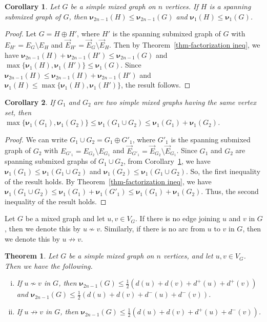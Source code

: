 \documentclass[12pt]{article}
\numberwithin{equation}{section}
\newtheorem{thm}{Theorem}[section]
\newtheorem{cor}{Corollary}[section]
\begin{document}
	\begin{cor}\label{cor-spanning ineq}
		Let $G$ be a simple mixed graph on $n$ vertices. If $H$ is a spanning submixed graph of $G$, then $\bm{\nu}_{2n-1}(H)\leq\bm{\nu}_{2n-1}(G)$ and $\bm{\nu}_{1}(H)\leq\bm{\nu}_{1}(G)$.
	\end{cor}
	\begin{proof}
		Let $G=H\oplus H'$, where $H'$ is the spanning submixed graph of $G$ with $E_{H'}=E_G\setminus E_H$ and $\vec{E}_{H'}=\vec{E}_G\setminus\vec{E}_H$. Then by Theorem~\ref{thm-factorization ineq}, we have $\bm{\nu}_{2n-1}(H)+\bm{\nu}_{2n-1}(H')\leq\bm{\nu}_{2n-1}(G)$ and $\max\{\bm{\nu}_{1}(H),\bm{\nu}_{1}(H')\}\leq\bm{\nu}_{1}(G)$. Since $\bm{\nu}_{2n-1}(H)\leq\bm{\nu}_{2n-1}(H)+\bm{\nu}_{2n-1}(H')$ and $\bm{\nu}_{1}(H)\leq\max\{\bm{\nu}_{1}(H),\bm{\nu}_{1}(H')\}$, the result follows.
	\end{proof}
	\begin{cor}
		If $G_1$ and $G_2$ are two simple mixed graphs having the same vertex set, then \\
		$\max\{\bm{\nu}_{1}(G_1),\bm{\nu}_{1}(G_2)\}\leq\bm{\nu}_{1}(G_1\cup G_2)\leq\bm{\nu}_{1}(G_1)+\bm{\nu}_{1}(G_2)$.
	\end{cor}
	\begin{proof}
		We can write $G_1\cup G_2=G_1\oplus G'_1$, where $G'_1$ is the spanning submixed graph of $G_2$ with $E_{G'_1}=E_{G_2}\setminus E_{G_1}$ and $\vec{E}_{G'_1}=\vec{E}_{G_2}\setminus \vec{E}_{G_1}$.	
		Since $G_1$ and $G_2$ are spanning submixed graphs of $G_1\cup G_2$, from Corollary~\ref{cor-spanning ineq}, we have $\bm{\nu}_{1}(G_1)\leq\bm{\nu}_{1}(G_1\cup G_2)$ and $\bm{\nu}_{1}(G_2)\leq\bm{\nu}_{1}(G_1\cup G_2)$. So, the first inequality of the result holds. By Theorem~\ref{thm-factorization ineq}, we have $\bm{\nu}_{1}(G_1\cup G_2)\leq\bm{\nu}_{1}(G_1)+\bm{\nu}_{1}(G'_1)\leq\bm{\nu}_{1}(G_1)+\bm{\nu}_{1}(G_2)$. Thus, the second inequality of the result holds.
	\end{proof}
	Let $G$ be a mixed graph and let $u,v\in V_G$. If there is no edge joining $u$ and $v$ in $G$, then we denote this by $u\not\sim v$. Similarly, if there is no arc from $u$ to $v$ in $G$, then we denote this by $u\not\rightarrow v$.
	\begin{thm}
		Let $G$ be a simple mixed graph on $n$ vertices, and let $u,v\in V_G$. Then we have the following.
		\begin{enumerate}[(i)]
			\item If $u\not\sim v$ in $G$, then $\bm{\nu}_{2n-1}(G)\leq\frac{1}{2}(d(u)+d(v)+d^+(u)+d^+(v))$ and $\bm{\nu}_{2n-1}(G)\leq\frac{1}{2}(d(u)+d(v)+d^-(u)+d^-(v))$.
			\item If $u\not\rightarrow v$ in $G$, then $\bm{\nu}_{2n-1}(G)\leq\frac{1}{2}(d(u)+d(v)+d^+(u)+d^-(v))$.
		\end{enumerate}
	\end{thm}
\end{document}
